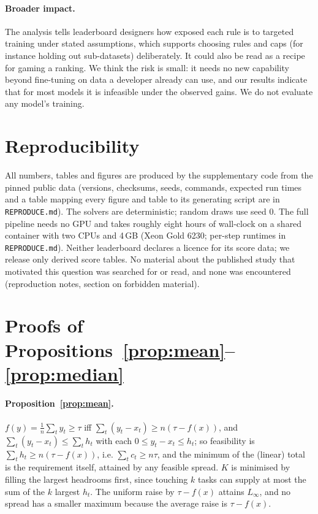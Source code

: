 \documentclass{article}
\begin{document}
\paragraph{Broader impact.}
The analysis tells leaderboard designers how exposed each rule is to targeted training under stated assumptions, which supports choosing rules and caps (for instance holding out sub-datasets) deliberately. It could also be read as a recipe for gaming a ranking. We think the risk is small: it needs no new capability beyond fine-tuning on data a developer already can use, and our results indicate that for most models it is infeasible under the observed gains. We do not evaluate any model's training.

\section{Reproducibility}
\label{sec:repro}
All numbers, tables and figures are produced by the supplementary code from the pinned public data (versions, checksums, seeds, commands, expected run times and a table mapping every figure and table to its generating script are in \texttt{REPRODUCE.md}). The solvers are deterministic; random draws use seed 0. The full pipeline needs no GPU and takes roughly eight hours of wall-clock on a shared container with two CPUs and 4\,GB (Xeon Gold 6230; per-step runtimes in \texttt{REPRODUCE.md}). Neither leaderboard declares a licence for its score data; we release only derived score tables. No material about the published study that motivated this question was searched for or read, and none was encountered (reproduction notes, section on forbidden material).





\appendix
\section{Proofs of Propositions~\ref{prop:mean}--\ref{prop:median}}
\label{app:proofs}
\paragraph{Proposition~\ref{prop:mean}.} $f(y)=\frac1n\sum_t y_t\ge\tau$ iff $\sum_t(y_t-x_t)\ge n(\tau-f(x))$, and $\sum_t(y_t-x_t)\le\sum_t h_t$ with each $0\le y_t-x_t\le h_t$; so feasibility is $\sum_t h_t\ge n(\tau-f(x))$, i.e. $\sum_t c_t\ge n\tau$, and the minimum of the (linear) total is the requirement itself, attained by any feasible spread. $K$ is minimised by filling the largest headrooms first, since touching $k$ tasks can supply at most the sum of the $k$ largest $h_t$. The uniform raise by $\tau-f(x)$ attains $L_\infty$, and no spread has a smaller maximum because the average raise is $\tau-f(x)$.
\end{document}

